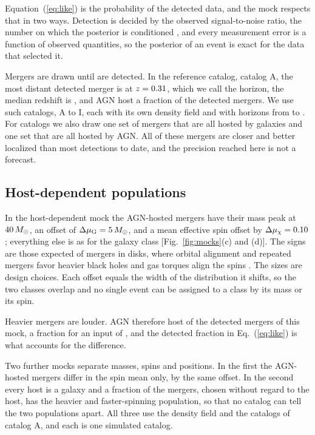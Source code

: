 \documentclass[aps,prd,reprint,twocolumn,superscriptaddress,nofootinbib,floatfix]{revtex4-2}
\newcommand{\msun}{\,M_\odot}
\newcommand{\dmuG}{\Delta\mu_{\rm G}}
\newcommand{\dmuchi}{\Delta\mu_\chi}
\begin{document}
Equation~(\ref{eq:like}) is the probability of the detected data, and the
mock respects that in two ways. Detection is decided by the observed
signal-to-noise ratio, the number on which the posterior is conditioned
\cite{Essick:2023upv}, and every measurement error is a function of observed
quantities, so the posterior of an event is exact for the data that selected
it.

Mergers are drawn until \MockNev{} are detected. In the reference catalog,
catalog A, the most distant detected merger is at $z=0.31$, which we
call the horizon, the median redshift is \MockzMedian, and AGN host a
fraction \MockfAGNRealised{} of the detected mergers. We use \JointNcat{}
such catalogs, A to I, each with its own density field and with horizons from
\MockzHorizonMin{} to \MockzHorizonMax. For \PureNcat{} catalogs we also
draw one set of \MockNev{} mergers that are all hosted by galaxies and one
set that are all hosted by AGN. All of these mergers are closer and better
localized than most detections to date, and the precision reached here is
not a forecast.

\subsection{Host-dependent populations}
\label{sec:hdmock}

In the host-dependent mock the AGN-hosted mergers have their mass peak at
$\MockMuGAGN\msun$, an offset of $\dmuG=\MockDmuG\msun$, and a mean effective
spin offset by $\dmuchi=\MockDmuChi$; everything else is as for the galaxy
class [Fig.~\ref{fig:mocks}(c) and (d)]. The signs are those expected of
mergers in disks, where orbital alignment and repeated mergers favor heavier
black holes \cite{Yang:2019okq,Yang:2019cbr} and gas torques align the spins
\cite{McKernan:2021nwk,Li:2025iux}. The sizes are design choices. Each offset
equals the width of the distribution it shifts, so the two classes overlap
and no single event can be assigned to a class by its mass or its spin.

Heavier mergers are louder. AGN therefore host \MockHDNagn{} of the
\MockNev{} detected mergers of this mock, a fraction \MockHDfDet{} for an
input of \MockfAGN, and the detected fraction in Eq.~(\ref{eq:like}) is what
accounts for the difference.

Two further mocks separate masses, spins and positions. In the first the
AGN-hosted mergers differ in the spin mean only, by the same offset. In the
second every host is a galaxy and a fraction \MockCtrlBranchFrac{} of the
mergers, chosen without regard to the host, has the heavier and
faster-spinning population, so that no catalog can tell the two populations
apart. All three use the density field and the catalogs of catalog A, and
each is one simulated catalog.
\end{document}
